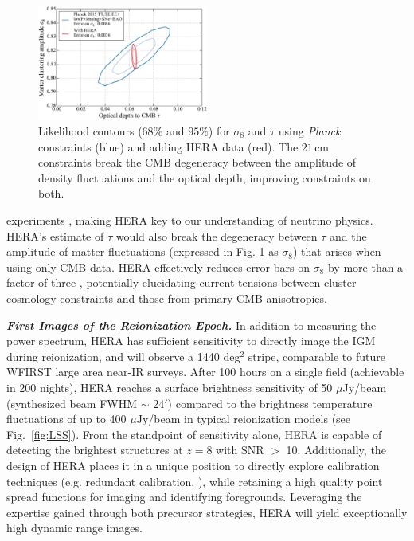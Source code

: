 \documentclass[preprint,11pt]{aastex}
\begin{document}
\begin{figure}[h!]
\centering
    \includegraphics[width=0.50\textwidth,clip]{plots/sigmaTau.pdf}
\caption{Likelihood contours ($68\%$ and $95\%$) for $\sigma_8$ and $\tau$ using \emph{Planck} constraints (blue) and 
adding HERA data (red). 
The $21\,\textrm{cm}$ constraints break the CMB degeneracy between the amplitude of density fluctuations and the optical depth, improving constraints on both.}
	\label{fig:sigma8Tau}
\end{figure} 

\noindent experiments
\citep{allison_et_al2015}, making HERA key to our understanding of neutrino
physics. HERA's estimate of $\tau$ would also break the degeneracy between
$\tau$ and the amplitude of matter fluctuations (expressed in Fig.
\ref{fig:sigma8Tau} as $\sigma_8$) that arises when using only
CMB data. HERA effectively reduces error bars on $\sigma_8$ by more
than a factor of three \citep{liu_et_al2015}, potentially elucidating
current tensions between cluster cosmology constraints and those from primary
CMB anisotropies.

\emph{\textbf{First Images of the Reionization Epoch.}}
\label{sec:imaging}
In addition to measuring the power spectrum, HERA has sufficient 
sensitivity to directly image the IGM during reionization,
and will observe a 1440 deg$^2$ stripe, comparable to future WFIRST
large area near-IR surveys.
 After 100 hours on a
single field (achievable in 200 nights), HERA reaches a surface brightness 
sensitivity of 50 $\mu$Jy/beam (synthesized beam FWHM $\sim$ 24$'$) compared 
to the brightness temperature fluctuations of up to 400 $\mu$Jy/beam in typical 
reionization models (see Fig.~\ref{fig:LSS}). From the standpoint of sensitivity alone, HERA is capable of 
detecting the brightest structures at $z=8$ with SNR $>$ 10. Additionally, the design 
of HERA places it in a unique position to directly explore calibration techniques
(e.g. redundant calibration, \citealt{liu_et_al2010}), while retaining a high quality 
point spread functions for imaging and identifying foregrounds. Leveraging the expertise gained 
through both precursor strategies, HERA will yield exceptionally high dynamic range
images.
\end{document}
